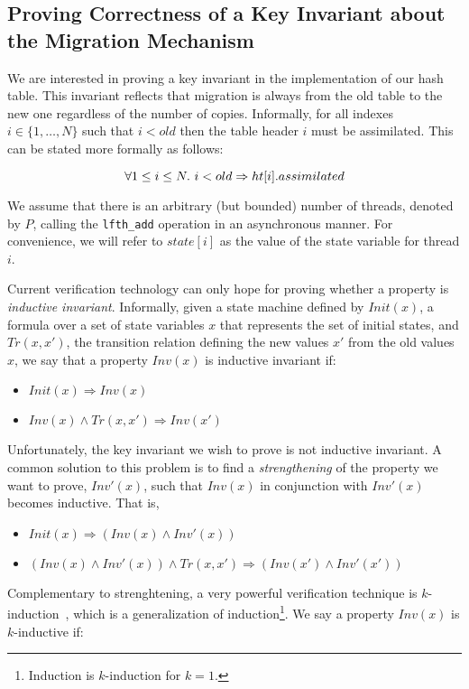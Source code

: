 \subsection{Proving Correctness of a Key Invariant about the Migration Mechanism}

We are interested in proving a key invariant in the implementation of
our hash table. This invariant reflects that migration is always from
the old table to the new one regardless of the number of
copies. Informally, for all indexes $i \in \{1, \ldots, N\}$ such that
$i < old$ then the table header $i$ must be assimilated. This can be stated
more formally as follows:

  \[ \forall 1 \leq i \leq N.~ i < old \Rightarrow \mbox{$ht[i]$}.assimilated \]

We assume that there is an arbitrary (but bounded) number of threads,
denoted by $P$, calling the \texttt{lfth\_add} operation in an
asynchronous manner. For convenience, we will refer to $state[i]$ as
the value of the state variable for thread $i$.


Current verification technology can only hope for proving whether a
property is \emph{inductive invariant}. Informally, given a state
machine defined by $Init(x)$, a formula over a set of state variables
$x$ that represents the set of initial states, and $Tr(x,x')$, the
transition relation defining the new values $x'$ from the old values
$x$, we say that a property $Inv(x)$ is inductive invariant if:

\begin{itemize}
\item $Init(x) \Rightarrow Inv(x)$
\item $Inv(x) \wedge Tr(x,x') \Rightarrow Inv(x')$
\end{itemize}

Unfortunately, the key invariant we wish to prove is not inductive
invariant. A common solution to this problem is to find a
\emph{strengthening} of the property we want to prove, $Inv'(x)$, such
that $Inv(x)$ in conjunction with $Inv'(x)$ becomes inductive. That
is,

\begin{itemize}
\item $Init(x) \Rightarrow (Inv(x) \wedge Inv'(x))$
\item $(Inv(x) \wedge Inv'(x)) \wedge Tr(x,x') \Rightarrow (Inv(x') \wedge Inv'(x'))$
\end{itemize}

Complementary to strenghtening, a very powerful verification technique
is $k$-induction~\cite{MouraRS03}, which is a generalization of
induction\footnote{Induction is $k$-induction for $k=1$.}. We say a
property $Inv(x)$ is $k$-inductive if:

